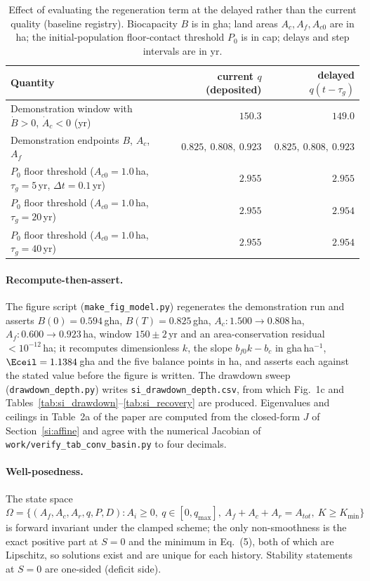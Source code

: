 \begin{table}[htbp]
\centering\small
\caption{Effect of evaluating the regeneration term at the delayed rather than the current quality (baseline registry). Biocapacity $B$ is in gha; land areas $A_c,A_f,A_{c0}$ are in ha; the initial-population floor-contact threshold $P_0$ is in cap; delays and step intervals are in yr.}
\label{tab:si_delay}
\begin{tabular}{l r r}
\toprule
Quantity & current $q$ (deposited) & delayed $q(t-\tau_g)$ \\
\midrule
Demonstration window with $\dot B>0$, $\dot A_c<0$ (yr) & $150.3$ & $149.0$ \\
Demonstration endpoints $B$, $A_c$, $A_f$ & $0.825,\ 0.808,\ 0.923$ & $0.825,\ 0.808,\ 0.923$ \\
$P_0$ floor threshold ($A_{c0}=1.0$\,ha, $\tau_g=5$\,yr, $\Delta t=0.1$\,yr) & $2.955$ & $2.955$ \\
$P_0$ floor threshold ($A_{c0}=1.0$\,ha, $\tau_g=20$\,yr) & $2.955$ & $2.954$ \\
$P_0$ floor threshold ($A_{c0}=1.0$\,ha, $\tau_g=40$\,yr) & $2.955$ & $2.954$ \\
\bottomrule
\end{tabular}
\end{table}

\paragraph{Recompute-then-assert.} The figure script (\texttt{make\_fig\_model.py}) regenerates the demonstration run and asserts $B(0)=0.594$\,gha, $B(T)=0.825$\,gha, $A_c:1.500\to0.808$\,ha, $A_f:0.600\to0.923$\,ha, window $150\pm2$\,yr and an area-conservation residual $<10^{-12}$\,ha; it recomputes dimensionless $k$, the slope $b_{f0}k-b_c$ in gha\,ha$^{-1}$, $\Eceil=1.1384$\,gha and the five balance points in ha, and asserts each against the stated value before the figure is written. The drawdown sweep (\texttt{drawdown\_depth.py}) writes \texttt{si\_drawdown\_depth.csv}, from which Fig.~1c and Tables~\ref{tab:si_drawdown}--\ref{tab:si_recovery} are produced. Eigenvalues and ceilings in Table~2a of the paper are computed from the closed-form $J$ of Section~\ref{si:affine} and agree with the numerical Jacobian of \texttt{work/verify\_tab\_conv\_basin.py} to four decimals.

\paragraph{Well-posedness.} The state space $\Omega=\{(A_f,A_c,A_r,q,P,D):A_i\ge0,\ q\in[0,q_{\max}],\ A_f+A_c+A_r=A_{tot},\ K\ge K_{\min}\}$ is forward invariant under the clamped scheme; the only non-smoothness is the exact positive part at $S=0$ and the minimum in Eq.~(5), both of which are Lipschitz, so solutions exist and are unique for each history. Stability statements at $S=0$ are one-sided (deficit side).

